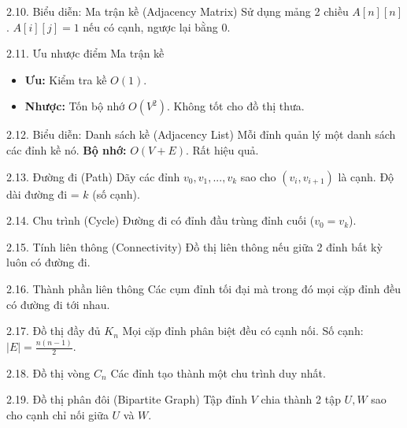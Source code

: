 \documentclass[10pt, xcolor={dvipsnames}]{beamer}
\begin{document}
\begin{frame}{2.10. Biểu diễn: Ma trận kề (Adjacency Matrix)}
    Sử dụng mảng 2 chiều $A[n][n]$. 
    $A[i][j] = 1$ nếu có cạnh, ngược lại bằng 0.
\end{frame}

\begin{frame}{2.11. Ưu nhược điểm Ma trận kề}
    \begin{itemize}
        \item \textbf{Ưu:} Kiểm tra kề $O(1)$.
        \item \textbf{Nhược:} Tốn bộ nhớ $O(V^2)$. Không tốt cho đồ thị thưa.
    \end{itemize}
\end{frame}

\begin{frame}{2.12. Biểu diễn: Danh sách kề (Adjacency List)}
    Mỗi đỉnh quản lý một danh sách các đỉnh kề nó.
    \textbf{Bộ nhớ:} $O(V+E)$. Rất hiệu quả.
\end{frame}

\begin{frame}{2.13. Đường đi (Path)}
    Dãy các đỉnh $v_0, v_1, ..., v_k$ sao cho $(v_i, v_{i+1})$ là cạnh. 
    Độ dài đường đi = $k$ (số cạnh).
\end{frame}

\begin{frame}{2.14. Chu trình (Cycle)}
    Đường đi có đỉnh đầu trùng đỉnh cuối ($v_0 = v_k$).
\end{frame}

\begin{frame}{2.15. Tính liên thông (Connectivity)}
    Đồ thị liên thông nếu giữa 2 đỉnh bất kỳ luôn có đường đi.
\end{frame}

\begin{frame}{2.16. Thành phần liên thông}
    Các cụm đỉnh tối đại mà trong đó mọi cặp đỉnh đều có đường đi tới nhau.
\end{frame}

\begin{frame}{2.17. Đồ thị đầy đủ $K_n$}
    Mọi cặp đỉnh phân biệt đều có cạnh nối. 
    Số cạnh: $|E| = \frac{n(n-1)}{2}$.
\end{frame}

\begin{frame}{2.18. Đồ thị vòng $C_n$}
    Các đỉnh tạo thành một chu trình duy nhất.
\end{frame}

\begin{frame}{2.19. Đồ thị phân đôi (Bipartite Graph)}
    Tập đỉnh $V$ chia thành 2 tập $U, W$ sao cho cạnh chỉ nối giữa $U$ và $W$.
\end{frame}
\end{document}
